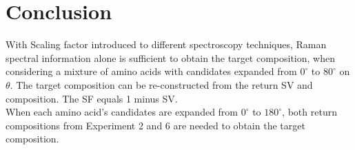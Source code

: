 \section{Conclusion}

With Scaling factor introduced to different spectroscopy techniques, Raman spectral information alone is sufficient to obtain the target composition, when considering a mixture of amino acids with candidates expanded from $0^{\circ}$ to $80^{\circ}$ on $\theta$. The target composition can be re-constructed from the return SV and composition. The SF equals 1 minus SV. \\

When each amino acid's candidates are expanded from $0^{\circ}$ to $180^{\circ}$, both return compositions from Experiment 2 and 6 are needed to obtain the target composition. \\
